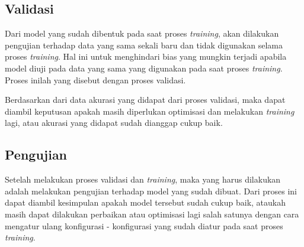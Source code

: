 \subsection{Validasi}

Dari model yang sudah dibentuk pada saat proses \textit{training}, akan dilakukan pengujian terhadap data yang sama sekali baru dan tidak digunakan selama proses \textit{training}. Hal ini untuk menghindari bias yang mungkin terjadi apabila model diuji pada data yang sama yang digunakan pada saat proses \textit{training}. Proses inilah yang disebut dengan proses validasi.

Berdasarkan dari data akurasi yang didapat dari proses validasi, maka dapat diambil keputusan apakah masih diperlukan optimisasi dan melakukan \textit{training} lagi, atau akurasi yang didapat sudah dianggap cukup baik.

\subsection{Pengujian}

Setelah melakukan proses validasi dan \textit{training}, maka yang harus dilakukan adalah melakukan pengujian terhadap model yang sudah dibuat. Dari proses ini dapat diambil kesimpulan apakah model tersebut sudah cukup baik, ataukah masih dapat dilakukan perbaikan atau optimisasi lagi salah satunya dengan cara mengatur ulang konfigurasi - konfigurasi yang sudah diatur pada saat proses \textit{training}.

